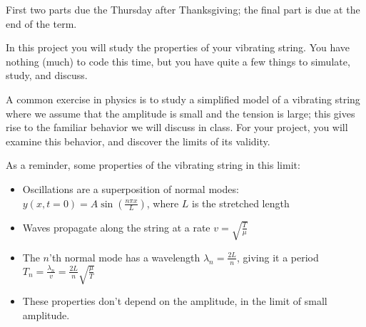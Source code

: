 \documentclass[12pt]{article}
\begin{document}
\Large
\centerline{}
\begin{center}
\large
First two parts due the Thursday after Thanksgiving; the final part is due at the end of the term.
\end{center}
\normalsize


In this project you will study the properties of your vibrating string. You have nothing (much) to code this time, but you have quite a few things to simulate, study, and discuss.

A common exercise in physics is to study a simplified model of a vibrating string where we assume that the amplitude is small and 
the tension is large; this gives rise to the familiar behavior we will discuss in class. For your project, you will examine this behavior, and discover the limits of its validity.

As a reminder, some properties of the vibrating string in this limit:

\begin{itemize}
\item{Oscillations are a superposition of normal modes: $y(x,t=0) = A \sin \left(\frac{n\pi x}{L}\right)$, where $L$ is the stretched length}
\item{Waves propagate along the string at a rate $v=\sqrt {\frac{T}{\mu}}$}
\item{The $n$'th normal mode has a wavelength $\lambda_n=\frac{2L}{n}$, giving it a period $T_n=\frac{\lambda_n}{v}=\frac{2L}{n} \sqrt{  \frac{\mu}{T}}$}
\item{These properties don't depend on the amplitude, in the limit of small amplitude.}
\end{itemize}
\end{document}
